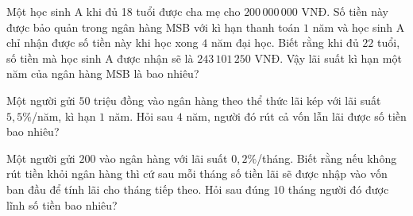 \begin{ex}%
	Một học sinh A khi đủ 18 tuổi được cha mẹ cho $200\, 000\, 000$ VNĐ. Số tiền này được bảo quản trong ngân hàng MSB với kì hạn thanh toán $1$ năm và học sinh A chỉ  nhận được số tiền này khi học xong $4$ năm đại học. Biết rằng khi đủ $22$ tuổi, số tiền mà học sinh A được nhận sẽ là $243\,101\, 250$ VNĐ. Vậy lãi suất kì hạn một năm của ngân hàng MSB là bao nhiêu?
\end{ex}

\begin{ex}%
	Một người gửi $50$ triệu đồng vào ngân hàng theo thể thức lãi kép với lãi suất $5{,}5\%$/năm, kì hạn $1$ năm. Hỏi sau  $4$ năm, người đó rút cả vốn lẫn lãi được số tiền bao nhiêu?
\end{ex}

\begin{ex}%
	Một người gửi $200$ vào ngân hàng với lãi suất $0{,}2\%$/tháng. Biết rằng nếu không rút tiền khỏi ngân hàng thì cứ sau mỗi tháng số tiền lãi sẽ được nhập vào vốn ban đầu để tính lãi cho tháng tiếp theo. Hỏi sau đúng $10$ tháng người đó được  lĩnh số tiền bao nhiêu?
\end{ex}

